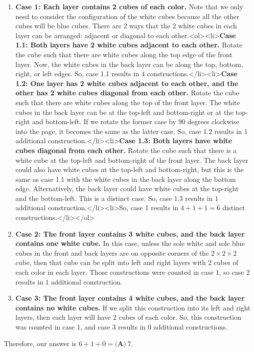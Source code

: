 \begin{enumerate}
 
            \begin{enumerate}
        \item \textbf{Case 1: Each layer contains 2 cubes of each color.} Note that we only need to consider the configuration of the white cubes because all the other cubes will be blue cubes. There are 2 ways that the 2 white cubes in each layer can be arranged: adjacent or diagonal to each other.<ol><li>\textbf{Case 1.1: Both layers have 2 white cubes adjacent to each other.} Rotate the cube such that there are white cubes along the top edge of the front layer. Now, the white cubes in the back layer can be along the top, bottom, right, or left edges. So, case 1.1 results in $4$ constructions.</li><li>\textbf{Case 1.2: One layer has 2 white cubes adjacent to each other, and the other has 2 white cubes diagonal from each other.} Rotate the cube such that there are white cubes along the top of the front layer. The white cubes in the back layer can be at the top-left and bottom-right or at the top-right and bottom-left. If we rotate the former case by 90 degrees clockwise into the page, it becomes the same as the latter case. So, case 1.2 results in $1$ additional construction.</li><li>\textbf{Case 1.3: Both layers have white cubes diagonal from each other.} Rotate the cube such that there is a white cube at the top-left and bottom-right of the front layer. The back layer could also have white cubes at the top-left and bottom-right, but this is the same as case 1.1 with the white cubes in the back layer along the bottom edge. Alternatively, the back layer could have white cubes at the top-right and the bottom-left. This is a distinct case. So, case 1.3 results in $1$ additional construction.</li><li>So, case 1 results in $4+1+1=6$ distinct constructions.</li></ol>
        \item \textbf{Case 2: The front layer contains 3 white cubes, and the back layer contains one white cube.} In this case, unless the sole white and sole blue cubes in the front and back layers are on opposite corners of the $2 \times 2 \times 2$ cube, then that cube can be split into left and right layers with 2 cubes of each color in each layer. Those constructions were counted in case 1, so case 2 results in $1$ additional construction.
        \item \textbf{Case 3: The front layer contains 4 white cubes, and the back layer contains no white cubes.} If we split this construction into its left and right layers, then each layer will have 2 cubes of each color. So, this construction was counted in case 1, and case 3 results in $0$ additional constructions.
            \end{enumerate}
            Therefore, our answer is $6+1+0=\boxed{\textbf{(A)}\ 7}$.


\end{enumerate}
